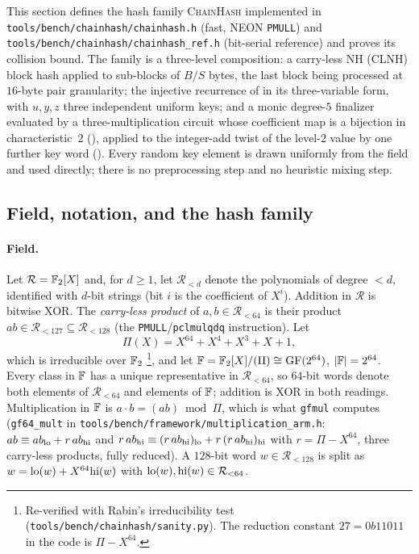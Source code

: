 This section defines the hash family \textsc{ChainHash} implemented in
\texttt{tools/bench/\allowbreak chainhash/\allowbreak chainhash.h} (fast, NEON \texttt{PMULL}) and
\texttt{tools/bench/\allowbreak chainhash/\allowbreak chainhash\_ref.h} (bit-serial reference) and proves
its collision bound.  The family is a three-level composition: a carry-less
NH (CLNH) block hash \cite{lemire2015clhash} applied to sub-blocks of $B/S$
bytes, the last block being processed at $16$-byte pair granularity; the
injective recurrence of  in its three-variable form, with
$u,y,z$ three independent uniform keys; and a monic degree-$5$ finalizer
evaluated by a three-multiplication circuit whose coefficient map is a
bijection in characteristic~$2$ (), applied to the
integer-add twist of the level-2 value by one further key word
().  Every random key
element is drawn uniformly from the field and used directly; there is no
preprocessing step and no heuristic mixing step.

\subsection{Field, notation, and the hash family}
\label{sec:ph:def}

\paragraph{Field.}
Let $\mathcal R=\mathbb{F}_2[X]$ and, for $d\ge1$, let $\mathcal R_{<d}$ denote the
polynomials of degree $<d$, identified with $d$-bit strings (bit $i$ is the
coefficient of $X^i$).  Addition in $\mathcal R$ is bitwise XOR.  The
\emph{carry-less product} of $a,b\in\mathcal R_{<64}$ is their product
$ab\in\mathcal R_{<127}\subseteq\mathcal R_{<128}$ (the \texttt{PMULL}/\texttt{pclmulqdq}
instruction).  Let
\[
  \Pi(X)=X^{64}+X^4+X^3+X+1 ,
\]
which is irreducible over $\mathbb{F}_2$ \cite[\S4.3]{lemire2015clhash}%
\footnote{Re-verified with Rabin's irreducibility test
(\texttt{tools/bench/chainhash/sanity.py}).  The reduction constant $27=0b11011$ in the
code is $\Pi-X^{64}$.}, and let $\mathbb{F}=\mathbb{F}_2[X]/(\Pi)\cong\mathrm{GF}(2^{64})$,
$|\mathbb{F}|=2^{64}$.  Every class in $\mathbb{F}$ has a unique representative in
$\mathcal R_{<64}$, so $64$-bit words denote both elements of $\mathcal R_{<64}$
and elements of $\mathbb{F}$; addition is XOR in both readings.  Multiplication in
$\mathbb{F}$ is $a\cdot b=(ab)\bmod\Pi$, which is what \texttt{gfmul} computes
(\texttt{gf64\_mult} in \texttt{tools/bench/\allowbreak framework/\allowbreak multiplication\_arm.h}:
$ab \equiv ab_{\mathrm{lo}} + r\,ab_{\mathrm{hi}}$ and $r\,ab_{\mathrm{hi}}\equiv (r\,ab_{\mathrm{hi}})_{\mathrm{lo}} + r\,(r\,ab_{\mathrm{hi}})_{\mathrm{hi}}$
with $r=\Pi-X^{64}$, three carry-less products, fully reduced).
A $128$-bit word $w\in\mathcal R_{<128}$ is split as $w=\mathrm{lo}(w)+X^{64}\mathrm{hi}(w)$
with $\mathrm{lo}(w),\mathrm{hi}(w)\in\mathcal R_{<64}$.

